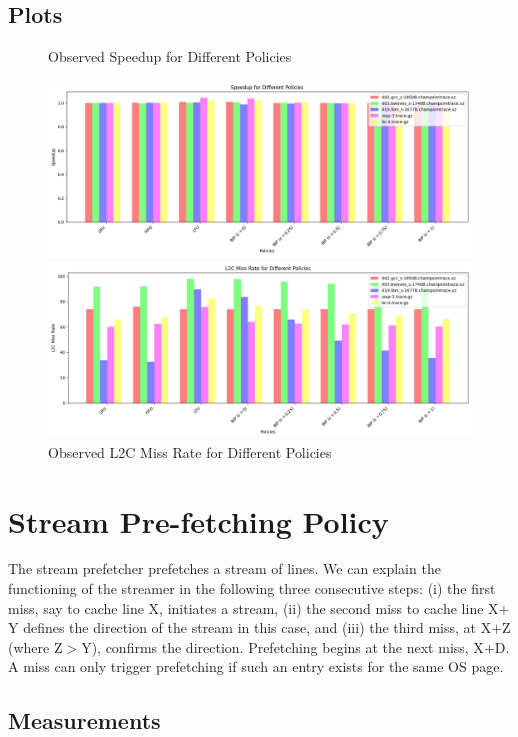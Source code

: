 \documentclass{article}
\begin{document}
\subsection{Plots}
\begin{figure}[H]
\caption{Observed Speedup for Different Policies}
\includegraphics[scale=0.4]{figure_1.png}
\caption{Observed L2C Miss Rate for Different Policies}
\includegraphics[scale=0.4]{figure_2.png}
\end{figure}
\section{Stream Pre-fetching Policy}
The stream prefetcher prefetches a stream of lines. We can explain the functioning of the streamer in the following three consecutive steps: (i) the first miss, say to cache line X, initiates a stream, (ii) the second miss to cache line X$+$Y defines the direction of the stream in this case, and (iii) the third miss, at X$+$Z (where Z$>$Y), confirms the direction. Prefetching begins at the next miss, X$+$D. A miss can only trigger prefetching if such an entry exists for the same OS page.

\subsection{Measurements}
\end{document}
